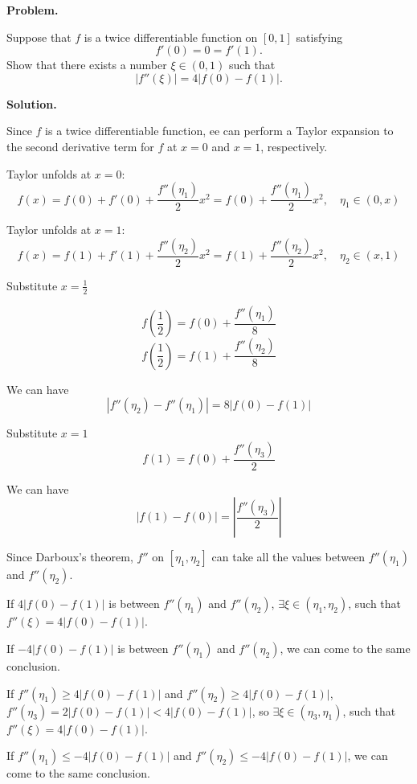 \documentclass[12pt, a4paper, oneside]{ctexart}
\newcounter{problemname}
\newenvironment{problem}{\begin{shaded}\stepcounter{problemname}\par\noindent\textbf{Problem\arabic{problemname}. }}{\end{shaded}\par}
\newenvironment{solution}{\par\noindent\textbf{Solution. }}{\par}
\begin{document}
\begin{problem}

\noindent Suppose that $ f $ is a twice differentiable function on $[0,1]$ satisfying
$$
f'(0) = 0 = f'(1).
$$
Show that there exists a number $ \xi \in (0,1) $ such that
$$
|f''(\xi)| = 4|f(0) - f(1)|.
$$

\end{problem}

\begin{solution}

Since $f$ is a twice differentiable function, ee can perform a Taylor expansion to the second derivative term for $f$ at $x=0$ and $x=1$, respectively.

Taylor unfolds at $x=0$:
$$
f(x)=f(0)+f'(0)+\frac{f''(\eta_1)}{2} x^2=f(0)+\frac{f''(\eta_1)}{2} x^2, \quad \eta_1\in (0,x)
$$

Taylor unfolds at $x=1$:
$$
f(x)=f(1)+f'(1)+\frac{f''(\eta_2)}{2} x^2=f(1)+\frac{f''(\eta_2)}{2} x^2, \quad \eta_2\in (x,1)
$$

Substitute $x = \frac{1}{2}$ 

$$
f( \frac{1}{2})=f(0)+\frac{f''(\eta_1)}{8} 
$$ 
$$
f( \frac{1}{2})=f(1)+\frac{f''(\eta_2)}{8} 
$$

We can have
$$
|f''(\eta_2)-f''(\eta_1)|=8|f(0)-f(1)|
$$

Substitute $x=1$
$$
f(1)=f(0)+\frac{f''(\eta_3)}{2} 
$$

We can have
$$
|f(1)-f(0)|=|\frac{f''(\eta_3)}{2} |
$$

Since Darboux's theorem, $f''$ on $[\eta_1,\eta_2]$ can take all the values between $f''(\eta_1)$ and $f''(\eta_2)$.

If $4|f(0)-f(1)|$ is between $f''(\eta_1)$ and $f''(\eta_2)$, $\exists \xi \in (\eta_1,\eta_2)$, such that $f''(\xi )=4|f(0)-f(1)|$.

If  $-4|f(0)-f(1)|$ is between $f''(\eta_1)$ and $f''(\eta_2)$, we can come to the same conclusion.

If $f''(\eta_1) \geq 4|f(0)-f(1)|$ and $f''(\eta_2) \geq 4|f(0)-f(1)|$, $f''(\eta_3)=2|f(0)-f(1)| < 4|f(0)-f(1)|$, so $\exists \xi \in (\eta_3,\eta_1)$, such that $f''(\xi )=4|f(0)-f(1)|$.

If $f''(\eta_1) \leq -4|f(0)-f(1)|$ and $f''(\eta_2) \leq -4|f(0)-f(1)|$, we can come to the same conclusion.

\end{solution}
\end{document}
